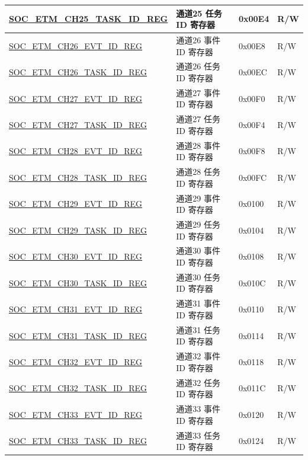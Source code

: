 \begin{longtable}{ | p{6cm} | p{6.2cm} | p{1.3cm} | p{2cm} | }
\hyperref[regdesc:SOCETMCHNTASKIDREG]{SOC\_ETM\_CH25\_TASK\_ID\_REG} & 通道25 任务 ID 寄存器 & 0x00E4 & R/W \\ \hline
\hyperref[regdesc:SOCETMCHNEVTIDREG]{SOC\_ETM\_CH26\_EVT\_ID\_REG} & 通道26 事件 ID 寄存器 & 0x00E8 & R/W \\ \hline
\hyperref[regdesc:SOCETMCHNTASKIDREG]{SOC\_ETM\_CH26\_TASK\_ID\_REG} & 通道26 任务 ID 寄存器 & 0x00EC & R/W \\ \hline
\hyperref[regdesc:SOCETMCHNEVTIDREG]{SOC\_ETM\_CH27\_EVT\_ID\_REG} & 通道27 事件 ID 寄存器 & 0x00F0 & R/W \\ \hline
\hyperref[regdesc:SOCETMCHNTASKIDREG]{SOC\_ETM\_CH27\_TASK\_ID\_REG} & 通道27 任务 ID 寄存器 & 0x00F4 & R/W \\ \hline
\hyperref[regdesc:SOCETMCHNEVTIDREG]{SOC\_ETM\_CH28\_EVT\_ID\_REG} & 通道28 事件 ID 寄存器 & 0x00F8 & R/W \\ \hline
\hyperref[regdesc:SOCETMCHNTASKIDREG]{SOC\_ETM\_CH28\_TASK\_ID\_REG} & 通道28 任务 ID 寄存器 & 0x00FC & R/W \\ \hline
\hyperref[regdesc:SOCETMCHNEVTIDREG]{SOC\_ETM\_CH29\_EVT\_ID\_REG} & 通道29 事件 ID 寄存器 & 0x0100 & R/W \\ \hline
\hyperref[regdesc:SOCETMCHNTASKIDREG]{SOC\_ETM\_CH29\_TASK\_ID\_REG} & 通道29 任务 ID 寄存器 & 0x0104 & R/W \\ \hline
\hyperref[regdesc:SOCETMCHNEVTIDREG]{SOC\_ETM\_CH30\_EVT\_ID\_REG} & 通道30 事件 ID 寄存器 & 0x0108 & R/W \\ \hline
\hyperref[regdesc:SOCETMCHNTASKIDREG]{SOC\_ETM\_CH30\_TASK\_ID\_REG} & 通道30 任务 ID 寄存器 & 0x010C & R/W \\ \hline
\hyperref[regdesc:SOCETMCHNEVTIDREG]{SOC\_ETM\_CH31\_EVT\_ID\_REG} & 通道31 事件 ID 寄存器 & 0x0110 & R/W \\ \hline
\hyperref[regdesc:SOCETMCHNTASKIDREG]{SOC\_ETM\_CH31\_TASK\_ID\_REG} & 通道31 任务 ID 寄存器 & 0x0114 & R/W \\ \hline
\hyperref[regdesc:SOCETMCHNEVTIDREG]{SOC\_ETM\_CH32\_EVT\_ID\_REG} & 通道32 事件 ID 寄存器 & 0x0118 & R/W \\ \hline
\hyperref[regdesc:SOCETMCHNTASKIDREG]{SOC\_ETM\_CH32\_TASK\_ID\_REG} & 通道32 任务 ID 寄存器 & 0x011C & R/W \\ \hline
\hyperref[regdesc:SOCETMCHNEVTIDREG]{SOC\_ETM\_CH33\_EVT\_ID\_REG} & 通道33 事件 ID 寄存器 & 0x0120 & R/W \\ \hline
\hyperref[regdesc:SOCETMCHNTASKIDREG]{SOC\_ETM\_CH33\_TASK\_ID\_REG} & 通道33 任务 ID 寄存器 & 0x0124 & R/W \\ \hline

\end{longtable}
